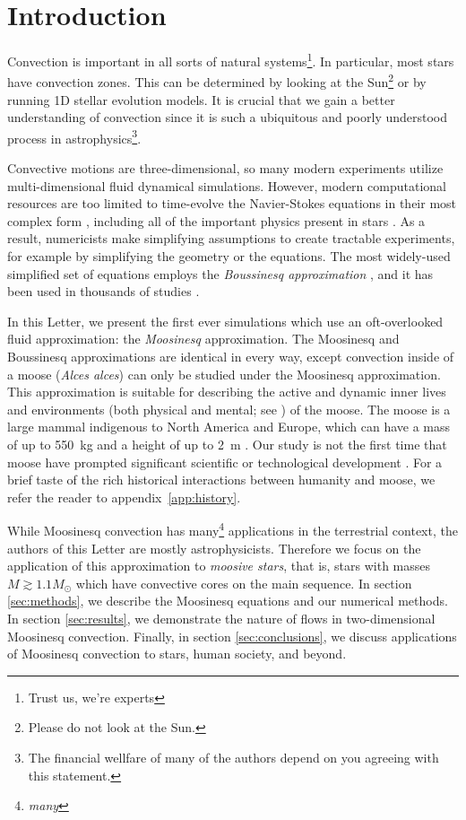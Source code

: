 \section{Introduction}
\label{sec:introduction}

Convection is important in all sorts of natural systems\footnote{Trust us, we're experts}.
In particular, most stars have convection zones.
This can be determined by looking at the Sun\footnote{Please do not look at the Sun.} or by running 1D stellar evolution models.
It is crucial that we gain a better understanding of convection since it is such a ubiquitous and poorly understood process in astrophysics\footnote{The financial wellfare of many of the authors depend on you agreeing with this statement.}.

Convective motions are three-dimensional, so many modern experiments utilize multi-dimensional fluid dynamical simulations.
However, modern computational resources are too limited to time-evolve the Navier-Stokes equations in their most complex form \citep{landau}, including all of the important physics present in stars \citep{Paxton2011, Paxton2013, Paxton2015, Paxton2018, Paxton2019}.
As a result, numericists make simplifying assumptions to create tractable experiments, for example by simplifying the geometry or the equations.
The most widely-used simplified set of equations employs the \emph{Boussinesq approximation} \citep{spiegel_veronis_1960}, and it has been used in thousands of studies \citep[see e.g.,][]{ahlers_etal_2009}.

In this Letter, we present the first ever simulations which use an oft-overlooked fluid approximation: the \emph{Moosinesq} approximation.
The Moosinesq and Boussinesq approximations are identical in every way, except convection inside of a moose (\emph{Alces alces}) can only be studied under the Moosinesq approximation.
This approximation is suitable for describing the active and dynamic inner lives and environments (both physical and mental; see \citealp{Gibson2015}) of the moose.
The moose is a large mammal indigenous to North America and Europe, which can have a mass of up to 550~kg and a height of up to 2~m \citep{CPWmoose}.
Our study is not the first time that moose have prompted significant scientific or technological development \citep[see, e.g.,][]{Handel2009}.
For a brief taste of the rich historical interactions between humanity and moose, we refer the reader to appendix~\ref{app:history}.

While Moosinesq convection has many\footnote{\emph{many}} applications in the terrestrial context, the authors of this Letter are mostly astrophysicists.
Therefore we focus on the application of this approximation to \emph{moosive stars}, that is, stars with masses $M \gtrsim 1.1 M_\odot$ which have convective cores on the main sequence.
In section \ref{sec:methods}, we describe the Moosinesq equations and our numerical methods.
In section \ref{sec:results}, we demonstrate the nature of flows in two-dimensional Moosinesq convection.
Finally, in section \ref{sec:conclusions}, we discuss applications of Moosinesq convection to stars, human society, and beyond.
